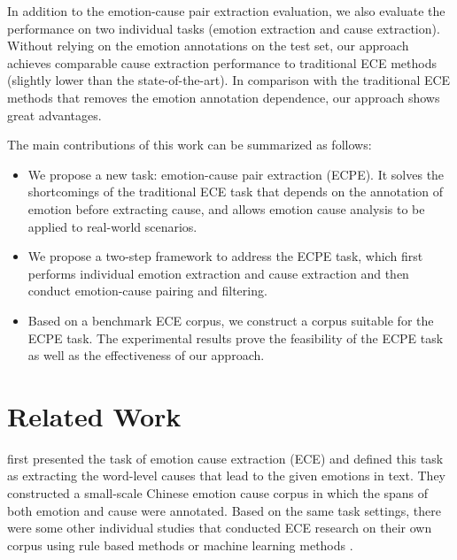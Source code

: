 \documentclass[11pt,a4paper]{article}
\begin{document}
In addition to the emotion-cause pair extraction evaluation, we also evaluate the performance on two individual tasks (emotion extraction and cause extraction).  Without relying on the emotion annotations on the test set, our approach achieves comparable cause extraction performance to traditional ECE methods (slightly lower than the state-of-the-art). In comparison with the traditional ECE methods that removes the emotion annotation dependence, our approach shows great advantages.

The main contributions of this work can be summarized as follows:


\begin{itemize}
	\item We propose a new task: emotion-cause pair extraction (ECPE). It solves the shortcomings of the traditional ECE task that depends on the annotation of emotion before extracting cause, and allows emotion cause analysis to be applied to real-world scenarios.
	\item We propose a two-step framework to address the ECPE task, which first performs individual emotion extraction and cause extraction and then conduct emotion-cause pairing and filtering. 
	\item Based on a benchmark ECE corpus, we construct a corpus suitable for the ECPE task. The experimental results prove the feasibility of the ECPE task as well as the effectiveness of our approach.
\end{itemize}







\section{Related Work}
\citet{lee2010text} first presented the task of emotion cause extraction (ECE) and defined this task as extracting the word-level causes that lead to the given emotions in text. They constructed a small-scale Chinese emotion cause corpus in which the spans of both emotion and cause were annotated. Based on the same task settings, there were some other individual studies that conducted ECE research on their own corpus using rule based methods \cite{neviarouskaya2013extracting, li2014text, gao2015emotion, gao2015rule, yada2017bootstrap} or machine learning methods \cite{ghazi2015detecting, song2015detecting}.
\end{document}
